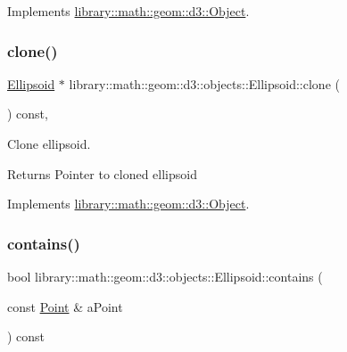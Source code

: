 Implements \hyperlink{classlibrary_1_1math_1_1geom_1_1d3_1_1_object_a5fc47b1ee5d9a28efc6010d3d1512470}{library\+::math\+::geom\+::d3\+::\+Object}.

\mbox{\label{classlibrary_1_1math_1_1geom_1_1d3_1_1objects_1_1_ellipsoid_a8982455e000708f1b7e4caf728e7ad40}} 
\subsubsection{\texorpdfstring{clone()}{clone()}}
{\footnotesize\ttfamily \hyperlink{classlibrary_1_1math_1_1geom_1_1d3_1_1objects_1_1_ellipsoid}{Ellipsoid} $\ast$ library\+::math\+::geom\+::d3\+::objects\+::\+Ellipsoid\+::clone (\begin{DoxyParamCaption}{ }\end{DoxyParamCaption}) const\hspace{0.3cm}{\ttfamily [override]}, {\ttfamily [virtual]}}



Clone ellipsoid. 

\begin{DoxyReturn}{Returns}
Pointer to cloned ellipsoid 
\end{DoxyReturn}


Implements \hyperlink{classlibrary_1_1math_1_1geom_1_1d3_1_1_object_a1a784c6b359e0eb97cd34fabc42f2f3f}{library\+::math\+::geom\+::d3\+::\+Object}.

\mbox{\label{classlibrary_1_1math_1_1geom_1_1d3_1_1objects_1_1_ellipsoid_ae54cb74c4e6445988ac4d78e00288dd2}} 
\subsubsection{\texorpdfstring{contains()}{contains()}\hspace{0.1cm}{\footnotesize\ttfamily [1/3]}}
{\footnotesize\ttfamily bool library\+::math\+::geom\+::d3\+::objects\+::\+Ellipsoid\+::contains (\begin{DoxyParamCaption}\item[{const \hyperlink{classlibrary_1_1math_1_1geom_1_1d3_1_1objects_1_1_point}{Point} \&}]{a\+Point }\end{DoxyParamCaption}) const}



